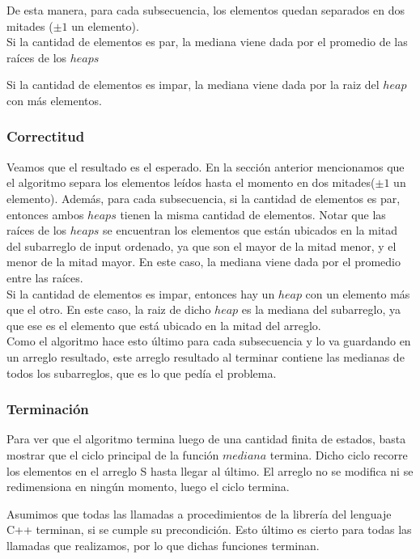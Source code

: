 \documentclass[spanish,a4paper]{article}
\begin{document}
De esta manera, para cada subsecuencia, los elementos quedan separados en dos mitades ($\pm 1$ un elemento).\\

Si la cantidad de elementos es par, la mediana viene dada por el promedio de las raíces de los $heaps$

Si la cantidad de elementos es impar, la mediana viene dada por la raiz del $heap$ con más elementos.

\subsubsection{Correctitud}

Veamos que el resultado es el esperado. En la sección anterior mencionamos que el algoritmo separa los elementos leídos hasta el momento en dos mitades($\pm 1$ un elemento).
\indent Además, para cada subsecuencia, si la cantidad de elementos es par, entonces ambos $heaps$ tienen la misma cantidad de elementos. Notar que las raíces de los $heaps$ se encuentran los elementos que están ubicados en la mitad del subarreglo de input ordenado, ya que son el mayor de la mitad menor, y el menor de la mitad mayor. En este caso, la mediana viene dada por el promedio entre las raíces.\\
\indent Si la cantidad de elementos es impar, entonces hay un $heap$ con un elemento más que el otro. En este caso, la raiz de dicho $heap$ es la mediana del subarreglo, ya que ese es el elemento que está ubicado en la mitad del arreglo.\\

Como el algoritmo hace esto último para cada subsecuencia y lo va guardando en un arreglo resultado, este arreglo resultado al terminar contiene las medianas de todos los subarreglos, que es lo que pedía el problema.

\subsubsection{Terminación}

Para ver que el algoritmo termina luego de una cantidad finita de estados, basta mostrar que el ciclo principal de la función $mediana$ termina. Dicho ciclo recorre los elementos en el arreglo S hasta llegar al último. El arreglo no se modifica ni se redimensiona en ningún momento, luego el ciclo termina.

Asumimos que todas las llamadas a procedimientos de la librería del lenguaje C++ terminan, si se cumple su precondición. Esto último es cierto para todas las llamadas que realizamos, por lo que dichas funciones terminan.
\end{document}

